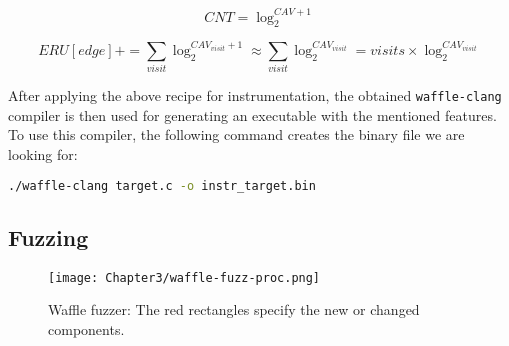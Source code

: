 \begin{equation}
  \label{eq:log}
  CNT = \log_{2}^{CAV+1}
\end{equation}

\begin{equation}
  \label{eq:ERU-log}
  ERU[edge] += \sum_{visit} \log_{2}^{CAV_{visit}+1} \approx \sum_{visit} \log_{2}^{CAV_{visit}} = visits \times \log_{2}^{CAV_{visit}}
\end{equation}



After applying the above recipe for instrumentation, the obtained \texttt{waffle-clang} compiler is then used for generating an executable with the mentioned features. To use this compiler, the following command creates the binary file we are looking for:

\begin{lstlisting}[language=bash,style=CommandStyle,label={lst:wafl-clang}]
  ./waffle-clang target.c -o instr_target.bin
\end{lstlisting}


\subsection{Fuzzing}



\begin{figure}[!b]
  \texttt{[image: Chapter3/waffle-fuzz-proc.png]}
  \centering
  \caption{Waffle fuzzer: The red rectangles specify the new or changed components.}
  \label{fig:waffle-fuzz-proc}
\end{figure}

